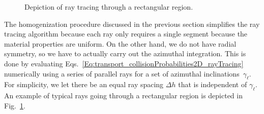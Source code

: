 \begin{figure}[tb!]
\begin{center}


\caption{Depiction of ray tracing through a rectangular region.}
\label{Fig:transport_rayTracingRectangularRegion}
\end{center}
\end{figure}

The homogenization procedure discussed in the previous section simplifies the ray tracing algorithm because each ray only requires a single segment because the material properties are uniform. On the other hand, we do not have radial symmetry, so we have to actually carry out the azimuthal integration. This is done by evaluating Eqs.~\eqref{Eq:transport_collisionProbabilities2D_rayTracing} numerically using a series of parallel rays for a set of azimuthal inclinations~$\gamma_\ell$. For simplicity, we let there be an equal ray spacing $\Delta h$ that is independent of $\gamma_\ell$. An example of typical rays going through a rectangular region is depicted in Fig.~\ref{Fig:transport_rayTracingRectangularRegion}.


